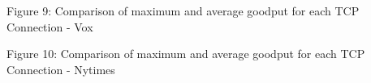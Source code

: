 \documentclass[12pt]{article}
\begin{document}
{
\begin{center}Figure 9: Comparison of maximum and average goodput for each TCP Connection - Vox\end{center}
}
\vspace*{-2cm}
\hspace*{-2cm}
{
\begin{center}Figure 10: Comparison of maximum and average goodput for each TCP Connection - Nytimes\end{center}
}
\end{document}
